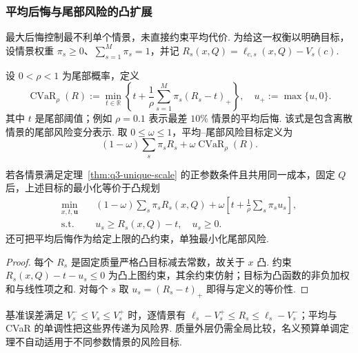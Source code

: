 \subsubsection{平均后悔与尾部风险的凸扩展}

最大后悔控制最不利单个情景，未直接约束平均代价. 为给这一权衡以明确目标，设情景权重 $\pi_s\ge0$、$\sum_{s=1}^M\pi_s=1$，并记 $R_s(x,Q)=\ell_{c,s}(x,Q)-V_s(c)$. 
\begin{definition}\label{def:q3-cvar-v37}
设 $0<\rho<1$ 为尾部概率，定义
\begin{equation}\label{eq:q3-cvar-v37}
\operatorname{CVaR}_{\rho}(R):=
\min_{t\in\mathbb R}\left\{t+\frac1{\rho}
\sum_{s=1}^M\pi_s(R_s-t)_+\right\},\quad u_+:=\max\{u,0\}.
\end{equation}
其中 $t$ 是尾部阈值；例如 $\rho=0.1$ 表示最差 $10\%$ 情景的平均后悔. 该式是包含离散情景的尾部风险变分表示\cite{rockafellar_cvar}. 取 $0\le\omega\le1$，平均--尾部风险目标定义为
\[
(1-\omega)\sum_s\pi_sR_s+\omega\operatorname{CVaR}_{\rho}(R).
\]
\end{definition}
\begin{proposition}\label{prop:q3-cvar-convex-v37}
    若各情景满足定理~\ref{thm:q3-unique-scale} 的正参数条件且共用同一成本，固定 $Q$ 后，上述目标的最小化等价于凸规划
    \begin{equation}\label{eq:q3-cvar-epigraph-v37}
        \begin{aligned}
            \min_{x,t,\boldsymbol u}\quad &
            (1-\omega)\sum_s\pi_sR_s(x,Q)
            +\omega\left[t+\frac1{\rho}\sum_s\pi_su_s\right],                 \\
            \text{s.t.}\quad              & u_s\ge R_s(x,Q)-t,\quad u_s\ge0.
        \end{aligned}
    \end{equation}
    还可把平均后悔作为给定上限的凸约束，单独最小化尾部风险. 
\end{proposition}
\begin{proof}
    每个 $R_s$ 是固定质量严格凸目标减去常数，故关于 $x$ 凸. 约束 $R_s(x,Q)-t-u_s\le0$ 为凸上图约束，其余约束仿射；目标为凸函数的非负加权和与线性项之和. 对每个 $s$ 取 $u_s=(R_s-t)_+$ 即得与定义的等价性. 
\end{proof}
基准误差满足 $V_s^-\le V_s\le V_s^+$ 时，逐情景有 $\ell_s-V_s^+\le R_s\le\ell_s-V_s^-$；平均与 CVaR 的单调性把这些界传递为风险界. 质量外层仍需全局比较，名义预算单调定理不自动适用于不同参数情景的风险目标. 


